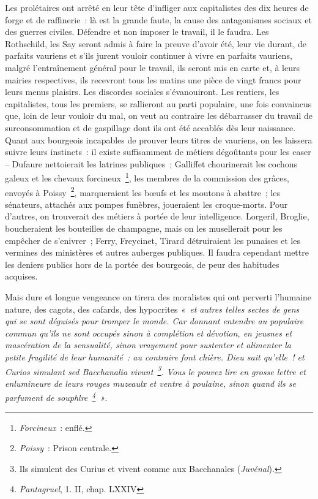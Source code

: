 \documentclass[french,twoside]{book} %
\begin{document}
Les prolétaires ont arrêté en leur tête d’infliger aux capitalistes des dix heures de forge et de raffinerie : là est la grande faute, la cause des antagonismes sociaux et des guerres civiles. Défendre et non imposer le travail, il le faudra. Les Rothschild, les Say seront admis à faire la preuve d’avoir été, leur vie durant, de parfaits vauriens et s’ils jurent vouloir continuer à vivre en parfaits vauriens, malgré l’entraînement général pour le travail, ils seront mis en carte et, à leurs mairies respectives, ils recevront tous les matins une pièce de vingt francs pour leurs menus plaisirs. Les discordes sociales s’évanouiront. Les rentiers, les capitalistes, tous les premiers, se rallieront au parti populaire, une fois convaincus que, loin de leur vouloir du mal, on veut au contraire les débarrasser du travail de surconsommation et de gaspillage dont ils ont été accablés dès leur naissance. Quant aux bourgeois incapables de prouver leurs titres de vauriens, on les laissera suivre leurs instincts : il existe suffisamment de métiers dégoûtants pour les caser – Dufaure nettoierait les latrines publiques ; Galliffet chourinerait les cochons galeux et les chevaux forcineux \footnote{\emph{Forcineux} : enflé.}, les membres de la commission des grâces, envoyés à Poissy \footnote{\emph{Poissy} : Prison centrale.}, marqueraient les bœufs et les moutons à abattre ; les sénateurs, attachés aux pompes funèbres, joueraient les croque-morts. Pour d’autres, on trouverait des métiers à portée de leur intelligence. Lorgeril, Broglie, boucheraient les bouteilles de champagne, mais on les musellerait pour les empêcher de s’enivrer ; Ferry, Freycinet, Tirard détruiraient les punaises et les vermines des ministères et autres auberges publiques. Il faudra cependant mettre les deniers publics hors de la portée des bourgeois, de peur des habitudes acquises.\par
Mais dure et longue vengeance on tirera des moralistes qui ont perverti l’humaine nature, des cagots, des cafards, des hypocrites \emph{« et autres telles sectes de gens qui se sont déguisés pour tromper le monde. Car donnant entendre au populaire commun qu’ils ne sont occupés sinon à complétion et dévotion, en jeusnes et mascération de la sensualité, sinon vrayement pour sustenter et alimenter la petite fragilité de leur humanité : au contraire font chière. Dieu sait qu’elle ! \emph{et Curios simulant sed Bacchanalia vivunt} \footnote{Ils simulent des Curius et vivent comme aux Bacchanales (\emph{Juvénal}).}. Vous le pouvez lire en grosse lettre et enlumineure de leurs rouges muzeaulx et ventre à poulaine, sinon quand ils se parfument de souphlre \footnote{\emph{Pantagruel}, 1. II, chap. LXXIV} »}.\par
\end{document}
